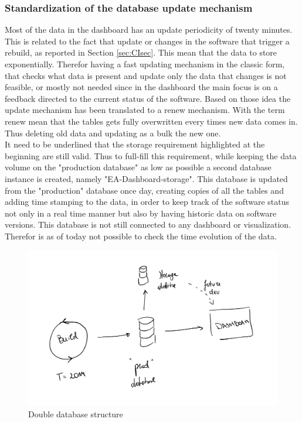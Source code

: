 \documentclass[../main.tex]{subfiles}
\begin{document}
\subsubsection{Standardization of the database update mechanism}
Most of the data in the dashboard has an update periodicity of twenty minutes. This is related to the fact that update or changes in the software that trigger a rebuild, as reported in Section \ref{sec:CIsec}. This mean that the data to store exponentially. Therefor having a fast updating mechanism in the classic form, that checks what data is present and update only the data that changes is not feasible, or mostly not needed since in the dashboard the main focus is on a feedback directed to the current status of the software.
Based on those idea the update mechanism has been translated to a renew mechanism. With the term renew mean that the tables gets fully overwritten every times new data comes in. Thus deleting old data and updating as a bulk the new one.\\
It need to be underlined that the storage requirement highlighted at the beginning are still valid. Thus to full-fill this requirement, while keeping the data volume on the "production database" as low as possible a second database instance is created, namely "EA-Dashboard-storage". This database is updated from the "production" database once day, creating copies of all the tables and adding time stamping to the data, in order to keep track of the software status not only in a real time manner but also by having historic data on software versions. This database is not still connected to any dashboard or visualization. Therefor is as of today not possible to check the time evolution of the data. 
\begin{figure}
    \centering
    \includegraphics[width=\linewidth]{images_folder/dual_db.png}
    \caption{Double database structure}
    \label{fig:dds}
\end{figure}
\end{document}
